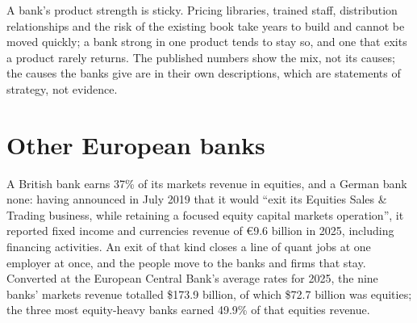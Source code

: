 \begin{remark}\label{rem:in:bank-markets-divisions:why}
A bank's product strength is sticky. Pricing libraries, trained staff, distribution relationships and the risk of the
existing book take years to build and cannot be moved quickly; a bank strong in one product tends to stay so, and one
that exits a product rarely returns. The published numbers show the mix, not its causes; the causes the banks give are
in their own descriptions, which are statements of strategy, not evidence.
\end{remark}

\section{Other European banks}

A British bank earns 37\% of its markets revenue in equities, and a German bank none: having announced in July 2019
that it would ``exit its Equities Sales \& Trading business, while retaining a focused equity capital markets
operation'', it reported fixed income and currencies revenue of \euro9.6 billion in 2025, including financing
activities. An exit of that kind closes a line of quant jobs at one employer at once, and the people move to the
banks and firms that stay. Converted at the European Central Bank's average rates for 2025, the nine banks' markets
revenue totalled \$173.9 billion, of which \$72.7 billion was equities; the three most equity-heavy banks earned 49.9\%
of that equities revenue.

\begin{omfigure}

\label{fig:in:bank-markets-divisions:mix}
\end{omfigure}

